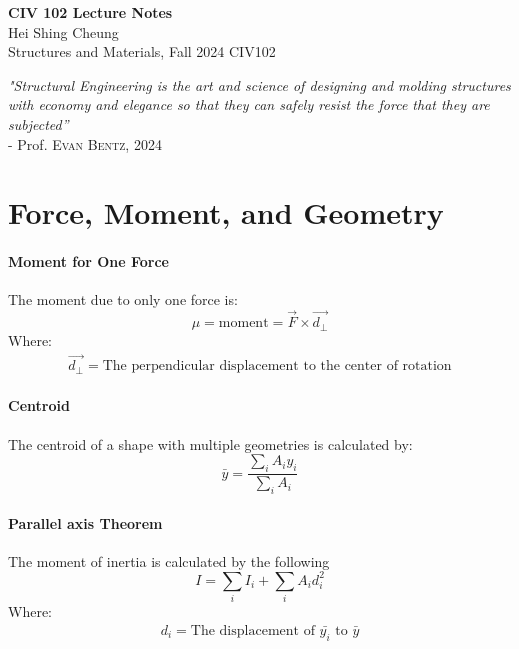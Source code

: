 

\thispagestyle{empty}
{\LARGE \bf CIV 102 Lecture Notes}\\
{\large Hei Shing Cheung}\\
Structures and Materials, Fall 2024 \hfill CIV102\\
\begin{center}
\textit{"Structural Engineering is the art and science of designing and molding structures with economy and elegance so that they can safely resist the force that they are subjected''} \\ - Prof. \textsc{Evan Bentz, 2024}
\end{center}
\vspace{10pt}
\section{Force, Moment, and Geometry} 
    \paragraph{Moment for One Force} The moment due to only one force is:
    \begin{equation}
        \mu = \mathrm{moment} = \Vec{F}\times\Vec{d_\perp}
    \end{equation}
Where:
\begin{equation*}
\begin{split}
\Vec{d_\perp} = \text{The perpendicular displacement to the center of rotation}
\end{split}
\end{equation*}
\paragraph{Centroid} The centroid of a shape with multiple geometries is calculated by: 
\begin{equation}
\bar{y} = \frac{\sum_i A_i  y_i}{\sum_i A_i}
\end{equation}
\paragraph{Parallel axis Theorem} The moment of inertia is calculated by the following
\begin{equation}
    I = \sum_i I_{i} + \sum_i A_i d_i^2
\end{equation}
Where:
\begin{equation*}
\begin{split}
d_i = \text{The displacement of $\bar{y_i}$ to $\bar{y}$}
\end{split}
\end{equation*}

